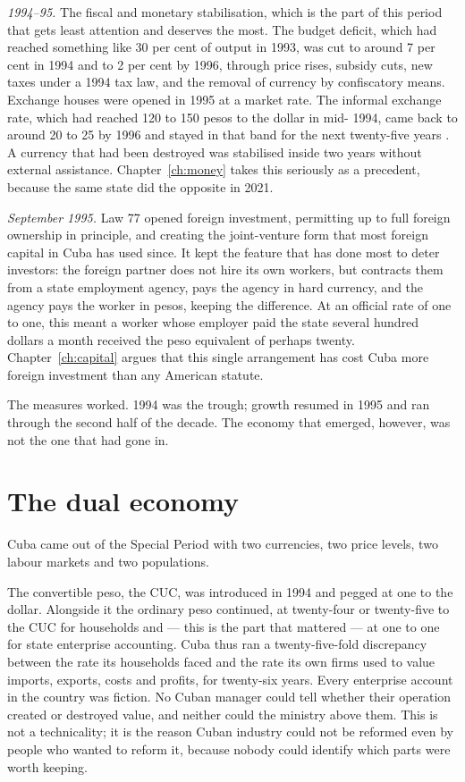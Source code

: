 \emph{1994--95.} The fiscal and monetary stabilisation, which is the part of
this period that gets least attention and deserves the most. The budget deficit,
which had reached something like 30 per cent of output in 1993, was cut to
around 7 per cent in 1994 and to 2 per cent by 1996, through price rises,
subsidy cuts, new taxes under a 1994 tax law, and the removal of currency by
confiscatory means. Exchange houses were opened in 1995 at a market rate. The
informal exchange rate, which had reached 120 to 150 pesos to the dollar in mid-
1994, came back to around 20 to 25 by 1996 and stayed in that band for the next
twenty-five years \citep{mesalago2005}.\unv{} A currency that had been destroyed was
stabilised inside two years without external assistance. Chapter~\ref{ch:money} takes this
seriously as a precedent, because the same state did the opposite in 2021.

\emph{September 1995.} Law 77 opened foreign investment, permitting up to full
foreign ownership in principle, and creating the joint-venture form that most
foreign capital in Cuba has used since. It kept the feature that has done most
to deter investors: the foreign partner does not hire its own workers, but
contracts them from a state employment agency, pays the agency in hard currency,
and the agency pays the worker in pesos, keeping the difference. At an official
rate of one to one, this meant a worker whose employer paid the state several
hundred dollars a month received the peso equivalent of perhaps twenty.
Chapter~\ref{ch:capital} argues that this single arrangement has cost Cuba more
foreign investment than any American statute.

The measures worked. 1994 was the trough; growth resumed in 1995 and ran through
the second half of the decade. The economy that emerged, however, was not the
one that had gone in.

\section{The dual economy}

Cuba came out of the Special Period with two currencies, two price levels, two
labour markets and two populations.

The convertible peso, the CUC, was introduced in 1994 and pegged at one to the
dollar. Alongside it the ordinary peso continued, at twenty-four or twenty-five
to the CUC for households and --- this is the part that mattered --- at one to
one for state enterprise accounting. Cuba thus ran a twenty-five-fold
discrepancy between the rate its households faced and the rate its own firms
used to value imports, exports, costs and profits, for twenty-six years. Every
enterprise account in the country was fiction. No Cuban manager could tell
whether their operation created or destroyed value, and neither could the
ministry above them. This is not a technicality; it is the reason Cuban
industry could not be reformed even by people who wanted to reform it, because
nobody could identify which parts were worth keeping.

